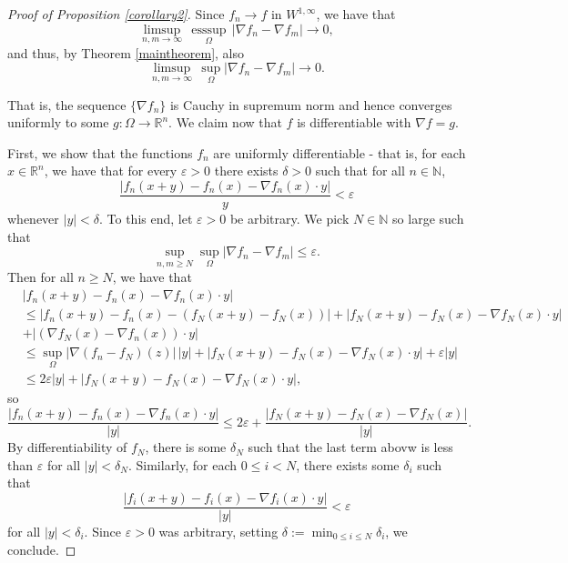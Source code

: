 \documentclass[10pt,a4paper]{amsart}
\DeclareMathOperator{\esssup}{esssup}
\begin{document}
\begin{proof}[Proof of Proposition \ref{corollary2}] 

Since $f_n \to f$ in $W^{1, \infty}$, we have that 
$$\limsup_{n, m \to \infty} \, \underset{\Omega}{\esssup} \, |\nabla f_n - \nabla f_m| \to 0,$$
and thus, by Theorem \ref{maintheorem}, also
$$\limsup_{n, m \to \infty} \,  \sup_{\Omega} |\nabla f_n - \nabla f_m| \to 0.$$

\noindent That is, the sequence $\{\nabla f_n\}$ is Cauchy in supremum norm and hence converges uniformly to some $g: \Omega \to \mathbb R^n$. We claim now that $f$ is differentiable with $\nabla f = g$.

First, we show that the functions $f_n$ are uniformly differentiable - that is, for each $x \in \mathbb R^n$, we have that for every $\varepsilon > 0$ there exists $\delta > 0$ such that for all $n \in \mathbb N$,
\begin{equation}\label{unifdif}\frac{|f_n (x+y) - f_n (x) - \nabla f_n(x) \cdot y|}{y} < \varepsilon\end{equation}
whenever $|y| < \delta$. To this end, let $\varepsilon > 0$ be arbitrary. We pick $N \in \mathbb N$ so large such that
$$\sup_{n, m \geq N} \sup_{\Omega} |\nabla f_n - \nabla f_m| \leq \varepsilon.$$
Then for all $n \geq N$, we have that
$$\begin{aligned}&|f_n (x+y) - f_n (x) - \nabla f_n(x) \cdot y| \\
& \leq |f_n (x+y) - f_n (x) - (f_N (x+y) - f_N (x))| + |f_N (x+y) - f_N (x) - \nabla f_N (x) \cdot y| \\
&+ |(\nabla f_N(x) - \nabla f_n (x)) \cdot y| \\
& \leq \sup_\Omega |\nabla(f_n - f_N)(z)| \,  |y| + |f_N (x+y) - f_N (x) - \nabla f_N (x) \cdot y| + \varepsilon |y| \\
& \leq 2 \varepsilon |y| + |f_N (x+y) - f_N (x) - \nabla f_N (x) \cdot y|,\end{aligned}$$
so
$$\frac{|f_n (x+y) - f_n (x) - \nabla f_n (x)\cdot y|}{|y|} \leq 2\varepsilon + \frac{|f_N (x+y) - f_N (x) - \nabla f_N (x)|}{|y|}.$$
By differentiability of $f_N$, there is some $\delta_N$ such that the last term abovw is less than $\varepsilon$ for all $|y| < \delta_N$. Similarly, for each $0 \leq i < N$, there exists some $\delta_i$ such that 
$$\frac{|f_i (x+y) - f_i (x) - \nabla f_i (x) \cdot y|}{|y|} < \varepsilon$$
for all $|y| < \delta_i.$ Since $\varepsilon > 0$ was arbitrary, setting $\delta := \min_{0 \leq i \leq N} \delta_i$, we conclude.



\end{proof}
\end{document}
